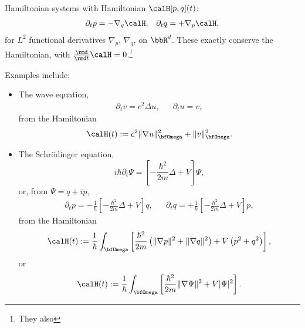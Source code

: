     \begin{example}
        Hamiltonian systems with Hamiltonian $\calH[p, q](t)$:
        \begin{align}
            \partial_{t}p  =  - \nabla_{q}\calH,  &&
            \partial_{t}q  =  + \nabla_{p}\calH,
        \end{align}
        for $L^{2}$ functional derivatives $\nabla_{p}$, $\nabla_{q}$, on $\bbR^{d}$. These exactly conserve the Hamiltonian, with $\frac{\rmd}{\rmd t}\calH  =  0$.\footnote{They also }

        Examples include:
        \begin{itemize}
            \item  The wave equation,
            \begin{align}
                \partial_{t}v  =  c^{2}\Delta u,  &&
                \partial_{t}u  =  v,
            \end{align}
            from the Hamiltonian
            \begin{equation}
                \calH(t)  :=  c^{2}\|\nabla u\|_{\bfOmega}^{2} + \|v\|_{\bfOmega}^{2}.
            \end{equation}
            \item  The Schrödinger equation,
            \begin{equation}
                i\hbar\partial_{t}\Psi  =  \left[- \frac{\hbar^{2}}{2m}\Delta + V\right]\Psi,
            \end{equation}
            or, from $\Psi  =  q + ip$,
            \begin{align}
                \partial_{t}p  =  - \frac{1}{\hbar}\left[- \frac{\hbar^{2}}{2m}\Delta + V\right]q,  &&
                \partial_{t}q  =  + \frac{1}{\hbar}\left[- \frac{\hbar^{2}}{2m}\Delta + V\right]p,
            \end{align}
            from the Hamiltonian
            \begin{equation}
                \calH(t)  :=  \frac{1}{\hbar}\int_{\bfOmega}\left[\frac{\hbar^{2}}{2m}\left(\|\nabla p\|^{2} + \|\nabla q\|^{2}\right) + V\left(p^{2} + q^{2}\right)\right],
            \end{equation}
            or
            \begin{equation}
                \calH(t)  :=  \frac{1}{\hbar}\int_{\bfOmega}\left[\frac{\hbar^{2}}{2m}\|\nabla\Psi\|^{2} + V|\Psi|^{2}\right].
            \end{equation}
        \end{itemize}
    \end{example}

